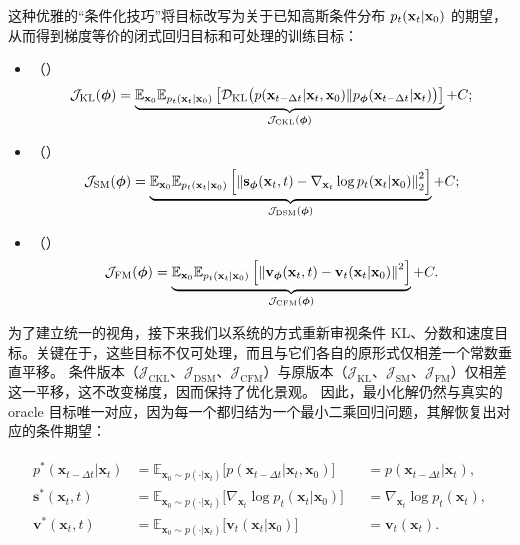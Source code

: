 这种优雅的“条件化技巧”将目标改写为关于已知高斯条件分布 $p_t({\mathbf{x}}_t | {\mathbf{x}}_0)$ 的期望，从而得到梯度等价的闭式回归目标和可处理的训练目标：
\begin{itemize}
    \item {}（）
    \[
    \mathcal{J}_{\text{KL}}(\bm{\phi}) = \underbrace{\mathbb{E}_{{\mathbf{x}}_0} \mathbb{E}_{p_t({\mathbf{x}}_t|{\mathbf{x}}_0)} \left[
        \mathcal{D}_{\mathrm{KL}}\big(p({\mathbf{x}}_{t-\Delta t}|{\mathbf{x}}_t, {\mathbf{x}}_0) \| p_{\bm{\phi}}({\mathbf{x}}_{t-\Delta t}|{\mathbf{x}}_t)\big)
    \right]}_{\mathcal{J}_{\text{CKL}}(\bm{\phi})} + C;
    \]    
    \item {}（）
    \[
    \mathcal{J}_{\text{SM}}(\bm{\phi}) = \underbrace{\mathbb{E}_{{\mathbf{x}}_0} \mathbb{E}_{p_t({\mathbf{x}}_t|{\mathbf{x}}_0)} \left[
        \left\| {\mathbf{s}}_{\bm{\phi}}({\mathbf{x}}_t, t) - \nabla_{{\mathbf{x}}_t} \log p_t({\mathbf{x}}_t | {\mathbf{x}}_0) \right\|_2^2
    \right]}_{\mathcal{J}_{\text{DSM}}(\bm{\phi})} + C;
    \]
    \item {}（）
    \[
    \mathcal{J}_{\text{FM}}(\bm{\phi}) = \underbrace{\mathbb{E}_{{\mathbf{x}}_0} \mathbb{E}_{p_t({\mathbf{x}}_t|{\mathbf{x}}_0)} \left[
        \left\| {\mathbf{v}}_{\bm{\phi}}({\mathbf{x}}_t, t) - {\mathbf{v}}_t({\mathbf{x}}_t | {\mathbf{x}}_0) \right\|^2
    \right]}_{\mathcal{J}_{\text{CFM}}(\bm{\phi})} + C.
    \]
\end{itemize}
为了建立统一的视角，接下来我们以系统的方式重新审视条件 KL、分数和速度目标。关键在于，这些目标不仅可处理，而且与它们各自的原形式仅相差一个常数垂直平移。
条件版本（$\mathcal{J}_{\text{CKL}}$、$\mathcal{J}_{\text{DSM}}$、$\mathcal{J}_{\text{CFM}}$）与原版本（$\mathcal{J}_{\text{KL}}$、$\mathcal{J}_{\text{SM}}$、$\mathcal{J}_{\text{FM}}$）仅相差这一平移，这不改变梯度，因而保持了优化景观。
因此，最小化解仍然与真实的 oracle 目标唯一对应，因为每一个都归结为一个最小二乘回归问题，其解恢复出对应的条件期望：
\begin{mdframed}
    \begin{align}\label{eq:three-minimizer-oracle}
\begin{aligned}
        p^*(\mathbf{x}_{t-\Delta t}|\mathbf{x}_t) &= \mathbb{E}_{\mathbf{x}_0 \sim p(\cdot|\mathbf{x}_t)} \big[p(\mathbf{x}_{t-\Delta t}|\mathbf{x}_t, \mathbf{x}_0)\big] &&= p(\mathbf{x}_{t-\Delta t}|\mathbf{x}_t), \\
    \mathbf{s}^*(\mathbf{x}_t, t) &= \mathbb{E}_{\mathbf{x}_0 \sim p(\cdot|\mathbf{x}_t)} \big[\nabla_{\mathbf{x}_t} \log p_t(\mathbf{x}_t|\mathbf{x}_0)\big] &&= \nabla_{\mathbf{x}_t} \log p_t(\mathbf{x}_t), \\
    \mathbf{v}^*(\mathbf{x}_t, t) &= \mathbb{E}_{\mathbf{x}_0 \sim p(\cdot|\mathbf{x}_t)} \big[\mathbf{v}_t(\mathbf{x}_t|\mathbf{x}_0)\big] &&= \mathbf{v}_t(\mathbf{x}_t).
\end{aligned}
\end{align}
\end{mdframed}



